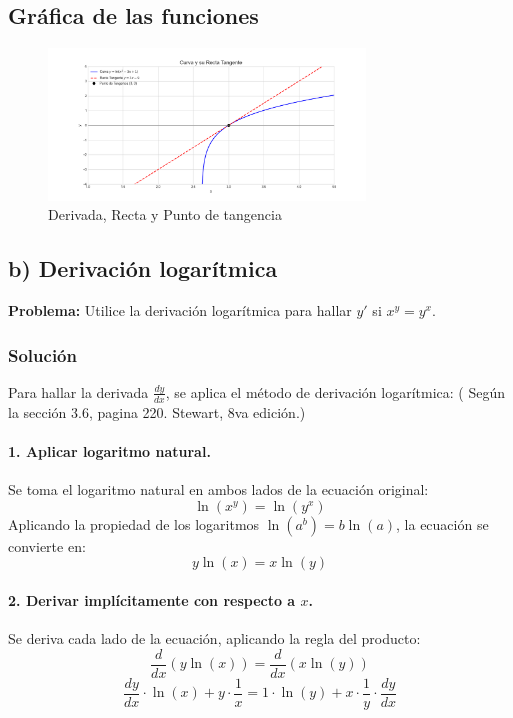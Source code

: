 \documentclass[12pt, letterpaper]{article}
\begin{document}
\subsection*{Gráfica de las funciones}
\begin{figure}[h]
    \centering
    \includegraphics[width=0.75\textwidth]{Figure_2.png}
    \caption{Derivada, Recta y Punto de tangencia}
    \label{fig:Figure_2}
\end{figure}

\newpage
\subsection*{b) Derivación logarítmica}
\textbf{Problema:} Utilice la derivación logarítmica para hallar $y'$ si $x^y = y^x$.

\subsubsection*{Solución}
Para hallar la derivada $\frac{dy}{dx}$, se aplica el método de derivación logarítmica: ( Según la sección 3.6, pagina 220. Stewart, 8va edición.)

\paragraph{1. Aplicar logaritmo natural.}
Se toma el logaritmo natural en ambos lados de la ecuación original:
$$
\ln(x^y) = \ln(y^x)
$$
Aplicando la propiedad de los logaritmos $\ln(a^b) = b\ln(a)$, la ecuación se convierte en:
$$
y \ln(x) = x \ln(y)
$$

\paragraph{2. Derivar implícitamente con respecto a $x$.}
Se deriva cada lado de la ecuación, aplicando la regla del producto:
$$
\frac{d}{dx}(y \ln(x)) = \frac{d}{dx}(x \ln(y))
$$
$$
\frac{dy}{dx} \cdot \ln(x) + y \cdot \frac{1}{x} = 1 \cdot \ln(y) + x \cdot \frac{1}{y} \cdot \frac{dy}{dx}
$$
\end{document}
